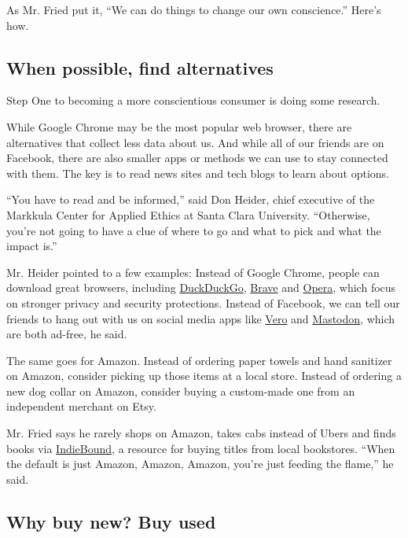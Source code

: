 As Mr. Fried put it, ``We can do things to change our own conscience.''
Here's how.

\hypertarget{when-possible-find-alternatives}{%
\subsection{When possible, find
alternatives}\label{when-possible-find-alternatives}}

Step One to becoming a more conscientious consumer is doing some
research.

While Google Chrome may be the most popular web browser, there are
alternatives that collect less data about us. And while all of our
friends are on Facebook, there are also smaller apps or methods we can
use to stay connected with them. The key is to read news sites and tech
blogs to learn about options.

``You have to read and be informed,'' said Don Heider, chief executive
of the Markkula Center for Applied Ethics at Santa Clara University.
``Otherwise, you're not going to have a clue of where to go and what to
pick and what the impact is.''

Mr. Heider pointed to a few examples: Instead of Google Chrome, people
can download great browsers, including
\href{https://www.nytimes3xbfgragh.onion/2019/07/15/technology/duckduckgo-private-search.html}{DuckDuckGo},
\href{https://brave.com/}{Brave} and
\href{https://www.opera.com/}{Opera}, which focus on stronger privacy
and security protections. Instead of Facebook, we can tell our friends
to hang out with us on social media apps like
\href{https://vero.co/}{Vero} and
\href{https://joinmastodon.org/}{Mastodon}, which are both ad-free, he
said.

The same goes for Amazon. Instead of ordering paper towels and hand
sanitizer on Amazon, consider picking up those items at a local store.
Instead of ordering a new dog collar on Amazon, consider buying a
custom-made one from an independent merchant on Etsy.

Mr. Fried says he rarely shops on Amazon, takes cabs instead of Ubers
and finds books via \href{https://www.indiebound.org/}{IndieBound}, a
resource for buying titles from local bookstores. ``When the default is
just Amazon, Amazon, Amazon, you're just feeding the flame,'' he said.

\hypertarget{why-buy-new-buy-used}{%
\subsection{Why buy new? Buy used}\label{why-buy-new-buy-used}}

